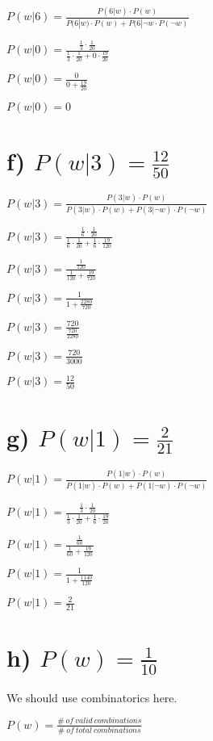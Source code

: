 \documentclass[11pt, oneside]{article}   	%
\begin{document}
$
P(w | 6) = \frac{P(6 | w) \cdot P(w)}{P(6 | w) \cdot P(w) + P(6 | \neg w \cdot P(\neg w)}
$

$
P(w | 0) = \frac{\frac{1}{3} \cdot \frac{1}{20}}{\frac{1}{3} \cdot \frac{1}{20} + 0 \cdot \frac{19}{20}}
$

$
P(w | 0) = \frac{0}{0 + \frac{19}{20}}
$

$
P(w | 0) = 0
$

\section*{f) $P(w | 3) = \frac{12}{50}$}

$
P(w | 3) = \frac{P(3 | w) \cdot P(w)}{P(3 | w) \cdot P(w) + P(3 | \neg w) \cdot P(\neg w)}
$

$
P(w | 3) = \frac{\frac{1}{6} \cdot \frac{1}{20}}{\frac{1}{6} \cdot \frac{1}{20} + \frac{1}{6} \cdot \frac{19}{120}}
$

$
P(w | 3) = \frac{\frac{1}{120}}{\frac{1}{120} + \frac{19}{720}}
$

$
P(w | 3) = \frac{1}{1 + \frac{2280}{720}}
$

$
P(w | 3) = \frac{720}{\frac{720}{2280}}
$

$
P(w | 3) = \frac{720}{3000}
$

$
P(w | 3) = \frac{12}{50}
$

\section*{g) $P(w | 1) = \frac{2}{21}$}

$
P(w | 1) = \frac{P(1 | w) \cdot P(w)}{P(1 | w) \cdot P(w) + P(1 | \neg w) \cdot P(\neg w)}
$

$
P(w | 1) = \frac{\frac{1}{3} \cdot \frac{1}{20}}{\frac{1}{3} \cdot \frac{1}{20} + \frac{1}{6} \cdot \frac{19}{20}}
$

$
P(w | 1) = \frac{\frac{1}{60}}{\frac{1}{60} + \frac{19}{120}}
$

$
P(w | 1) = \frac{1}{1 + \frac{1140}{120}}
$

$
P(w | 1) = \frac{2}{21}
$

\section*{h) $P(w) = \frac{1}{10}$}

We should use combinatorics here.

$
P(w) = \frac{\#\ of\ valid\ combinations}{\#\ of\ total\ combinations}
$
\end{document}
